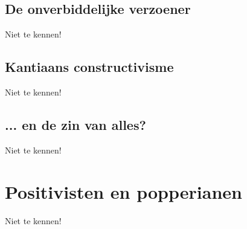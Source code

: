 \subsection{De onverbiddelijke verzoener}
Niet te kennen!
\subsection{Kantiaans constructivisme}
Niet te kennen!
\subsection{... en de zin van alles?}
Niet te kennen!
\section{Positivisten en popperianen}
Niet te kennen!
